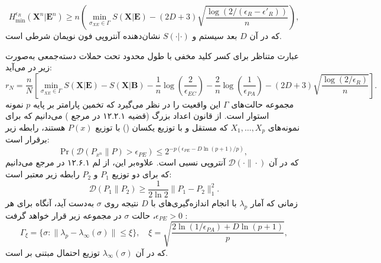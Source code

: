 \begin{equation}
	H_{\min}^{\epsilon_R}(\bm{X}^n | \bm{E}^n) \geq n \left( \min_{\sigma_{XE} \in \Gamma} S(\bm{X}|\bm{E}) - (2D + 3) \sqrt{\frac{\log(2/(\epsilon_R - \epsilon'_R))}{n}} \right),
	\label{eq:8-36}
\end{equation}
که در آن $D$ بعد سیستم و $S(\cdot|\cdot)$ نشان‌دهنده آنتروپی فون نویمان شرطی است.

عبارت متناظر برای کسر کلید مخفی با طول محدود تحت حملات دسته‌جمعی به‌صورت زیر در می‌آید:
\begin{equation}
	r_N = \frac{n}{N} \left[ \min_{\sigma_{XE} \in \Gamma} S(\bm{X}|\bm{E}) - S(\bm{X}|\bm{B}) - \frac{1}{n} \log \left( \frac{2}{\epsilon_{EC}} \right) - \frac{2}{n} \log \left( \frac{1}{\epsilon_{PA}} \right) - (2D + 3) \sqrt{\frac{\log(2/\epsilon_R)}{n}} \right].
	\label{eq:8-37}
\end{equation}
مجموعه حالت‌های $\Gamma$ این واقعیت را در نظر می‌گیرد که تخمین پارامتر بر پایه $p$ نمونه استوار است. از قانون اعداد بزرگ (قضیه ۱۲.۲.۱ در مرجع \cite{8-38}) می‌دانیم که برای نمونه‌های $X_1, \dots, X_p$ که مستقل و با توزیع یکسان () با توزیع $P(x)$ هستند، رابطه زیر برقرار است:
\begin{equation}
	\text{Pr} \left( \mathcal{D}(P_{x^n} \| P) > \epsilon_{PE} \right) \leq 2^{-p (\epsilon_{PE} - D \ln(p+1)/p)},
	\label{eq:8-38}
\end{equation}
که در آن $\mathcal{D}(\cdot \| \cdot)$ آنتروپی نسبی است. علاوه‌بر این، از لم ۱۲.۶.۱ در مرجع \cite{8-38} می‌دانیم که برای دو توزیع $P_1$ و $P_2$ رابطه زیر معتبر است:
\begin{equation}
	\mathcal{D}(P_1 \| P_2) \geq \frac{1}{2 \ln 2} \|P_1 - P_2\|_1^2.
	\label{eq:8-39}
\end{equation}
زمانی که آمار $\lambda_p$ با انجام اندازه‌گیری‌های  با $D$ نتیجه روی $\sigma$ به‌دست آید، آنگاه برای هر $\epsilon_{PE} > 0$، حالت $\sigma$ در مجموعه زیر قرار خواهد گرفت \cite{8-28, 8-29}:
\begin{equation}
	\Gamma_\xi = \{ \sigma : \|\lambda_p - \lambda_\infty(\sigma)\| \leq \xi \}, \quad \xi = \sqrt{\frac{2 \ln(1/\epsilon_{PA}) + D \ln(p+1)}{p}},
	\label{eq:8-40}
\end{equation}
که در آن $\lambda_\infty(\sigma)$ توزیع احتمال مبتنی بر  است.





